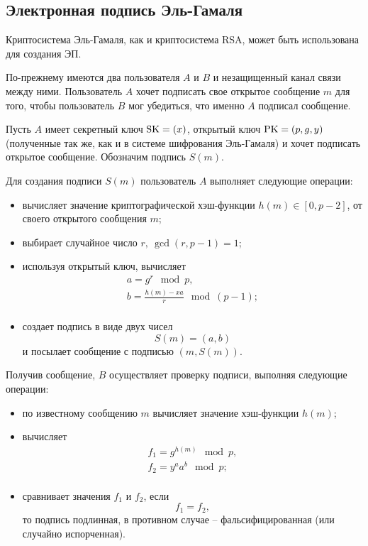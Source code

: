 \subsection[Электронная подпись]{Электронная подпись Эль-Гамаля}

Криптосистема Эль-Гамаля, как и криптосистема RSA, может быть использована для создания ЭП.

По-прежнему имеются два пользователя $A$ и $B$ и незащищенный канал связи между ними. Пользователь $A$  хочет подписать свое открытое сообщение $m$  для того, чтобы пользователь $B$ мог убедиться, что именно $A$ подписал сообщение.

Пусть $A$ имеет секретный ключ $\textrm{SK} = (x)$, открытый ключ $\textrm{PK} = (p,g,y)$ (полученные так же, как и в системе шифрования Эль-Гамаля) и хочет подписать открытое сообщение. Обозначим подпись $S(m)$.

Для создания подписи $S(m)$ пользователь $A$ выполняет следующие операции:
\begin{itemize}
    \item вычисляет значение криптографической хэш-функции  $h(m) \in [0,p-2]$, от своего открытого сообщения $m$;
    \item выбирает случайное число $r, ~ \gcd(r, p-1)=1$;
    \item используя открытый ключ, вычисляет
        \[ \begin{array}{l}
            a = g^r \mod p, \\
            b = \frac{h(m) - xa}{r} \mod (p-1); \\
        \end{array} \]
    \item создает подпись в виде двух чисел
        \[ S(m) = (a, b) \]
        и посылает сообщение с подписью $(m, S(m))$.
\end{itemize}

Получив сообщение, $B$ осуществляет проверку подписи, выполняя следующие операции:
\begin{itemize}
    \item по известному сообщению $m$ вычисляет значение хэш-функции $h(m)$;
    \item вычисляет
        \[ \begin{array}{l}
            f_1 = g^{h(m)} \mod p, \\
            f_2 = y^a a^b \mod p; \\
        \end{array} \]
    \item сравнивает значения $f_1$ и $f_2$, если
        \[ f_1 = f_2, \]
        то подпись подлинная, в противном случае -- фальсифицированная (или случайно испорченная).
\end{itemize}

